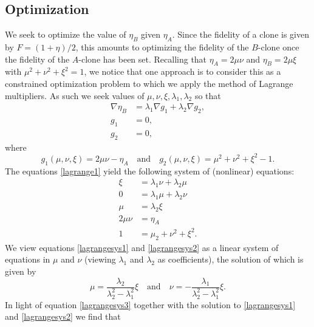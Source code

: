 \documentclass[reqno]{amsart}
\numberwithin{lemma}{section}
\numberwithin{proposition}{section}
\begin{document}
\subsection{Optimization} We seek to optimize the value of $\eta_{B}$ given $\eta_{A}$. Since the fidelity of a clone is given by $F = (1 + \eta)/2$, this amounts to optimizing the fidelity of the $B$-clone once the fidelity of the $A$-clone has been set. Recalling that $\eta_{A} = 2 \mu \nu$ and $\eta_{B} = 2 \mu \xi$ with $\mu^{2} + \nu^{2} + \xi^{2} = 1$, we notice that one approach is to consider this as a constrained optimization problem to which we apply the method of Lagrange multipliers. As such we seek values of $\mu, \nu, \xi, \lambda_{1}, \lambda_{2}$ so that
\begin{equation} 
	\label{lagrange1}
\begin{aligned}
	\nabla \eta_{B} &= \lambda_{1} \nabla g_{1} + \lambda_{2} \nabla g_{2},\\
	g_{1} &= 0,\\
	g_{2} &= 0,
\end{aligned}
\end{equation}
where
\begin{equation*}
	g_{1}(\mu, \nu, \xi) = 2 \mu \nu - \eta_{A} \quad \text{and} \quad g_{2}(\mu, \nu, \xi) = \mu^{2} + \nu^{2} + \xi^{2} - 1.
\end{equation*}
The equations \eqref{lagrange1} yield the following system of (nonlinear) equations:
\begin{align}
	\xi &= \lambda_{1} \nu + \lambda_{2} \mu \label{lagrangesys1}\\
	0 &= \lambda_{1} \mu + \lambda_{2} \nu \label{lagrangesys2}\\
	\mu &= \lambda_{2} \xi \label{lagrangesys3}\\
	2 \mu \nu &= \eta_{A} \label{lagrangesys4}\\
	1 &= \mu_{2} + \nu^{2} + \xi^{2}. \label{lagrangesys5} 
\end{align}
We view equations \eqref{lagrangesys1} and \eqref{lagrangesys2} as a linear system of equations in $\mu$ and $\nu$ (viewing $\lambda_{1}$ and $\lambda_{2}$ as coefficients), the solution of which is given by
\begin{equation}
	\mu = \frac{\lambda_{2}}{\lambda_{2}^{2} - \lambda_{1}^{2}} \xi \quad \text{and} \quad \nu = - \frac{\lambda_{1}}{\lambda_{2}^{2} - \lambda_{1}^{2}} \xi.
\end{equation}
In light of equation \eqref{lagrangesys3} together with the solution to \eqref{lagrangesys1} and \eqref{lagrangesys2} we find that
\end{document}
